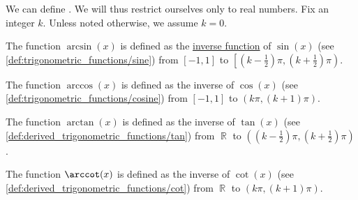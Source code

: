 \begin{definition}\label{def:inverse_trigonometric_functions}
  We can define . We will thus restrict ourselves only to real numbers. Fix an integer \( k \). Unless noted otherwise, we assume \( k = 0 \).

  \begin{thmenum}
     The  function \( \arcsin(x) \) is defined as the \hyperref[def:set_valued_function/inverse]{inverse function} of \( \sin(x) \) (see \cref{def:trigonometric_functions/sine}) from \( [-1, 1] \) to \( \left[(k - \tfrac 1 2) \pi, (k + \tfrac 1 2) \pi \right) \).

     The  function \( \arccos(x) \) is defined as the inverse of \( \cos(x) \) (see \cref{def:trigonometric_functions/cosine}) from \( [-1, 1] \) to \( (k\pi, (k + 1)\pi) \).

     The  function \( \arctan(x) \) is defined as the inverse of \( \tan(x) \) (see \cref{def:derived_trigonometric_functions/tan}) from \( \BbbR \) to \( \left((k - \tfrac 1 2) \pi, (k + \tfrac 1 2) \pi \right) \).

     The  function \( \arccot(x) \) is defined as the inverse of \( \cot(x) \) (see \cref{def:derived_trigonometric_functions/cot}) from \( \BbbR \) to \( (k\pi, (k + 1)\pi) \).
  \end{thmenum}
\end{definition}

